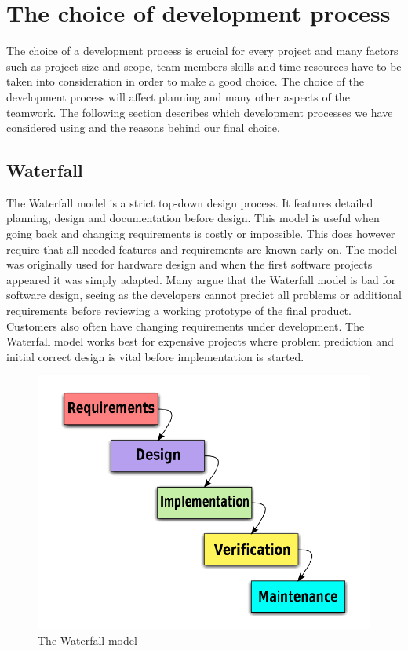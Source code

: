 \section{The choice of development process}
The choice of a development process is crucial for every project and many factors
such as project size and scope, team members skills and time resources have to be taken into
consideration in order to make a good choice. The choice of the development process will affect
planning and many other aspects of the teamwork. The following section describes
which development processes we have considered using and the reasons behind our final choice.

\subsection{Waterfall}
The Waterfall model is a strict top-down design process. \cite{bib:waterfall}It features detailed planning, design and
documentation before design. This model is useful when going back and changing requirements is
costly or impossible. This does however require that all needed features and requirements are known
early on. The model was originally used for hardware design and when the first software projects 
appeared it was simply adapted. Many argue that the Waterfall model is bad for software design, seeing
as the developers cannot predict all problems or additional requirements before reviewing a working
prototype of the final product. Customers also often have changing requirements under development.
The Waterfall model works best for expensive projects where problem prediction and initial correct design
is vital before implementation is started.
\begin{figure}[h!]
\centering \includegraphics[scale=0.30]{img/designmodel-waterwall} \caption{The Waterfall model}
\label{fig:desigmodel-waterfall}
\end{figure}


